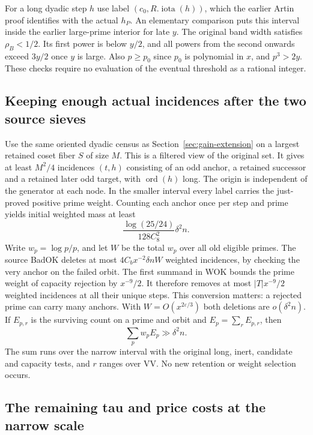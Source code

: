 \documentclass[12pt,letterpaper]{article}
\DeclareRobustCommand{\id}[1]{\mbox{\small\ttfamily #1}}
\begin{document}
For a long dyadic step \(h\) use label \((c_0,R.\operatorname{iota}(h))\), which the earlier Artin proof identifies with the actual \(h_P\). An elementary comparison puts this interval inside the earlier large-prime interior for late \(y\). The original band width satisfies \(\rho_B<1/2\). Its first power is below \(y/2\), and all powers from the second onwards exceed \(3y/2\) once \(y\) is large. Also \(p\ge p_0\) since \(p_0\) is polynomial in \(x\), and \(p^3>2y\). These checks require no evaluation of the eventual threshold as a rational integer.

\subsection{Keeping enough actual incidences after the two source sieves}

Use the same oriented dyadic census as Section~\ref{sec:gain-extension} on a largest retained coset fiber \(S\) of size \(M\). This is a filtered view of the original set. It gives at least \(M^2/4\) incidences \((t,h)\) consisting of an odd anchor, a retained successor and a retained later odd target, with \(\operatorname{ord}(h)\) long. The origin is independent of the generator at each node. In the smaller interval every label carries the just-proved positive prime weight. Counting each anchor once per step and prime yields initial weighted mass at least
\[
                  \frac{\log(25/24)}{128 C_8^2}\delta^2 n .
\]
Write \(w_p=\log p/p\), and let \(W\) be the total \(w_p\) over all old eligible primes. The source \id{BadOK} deletes at most \(4C_b x^{-2}\delta n W\) weighted incidences, by checking the very anchor on the failed orbit. The first summand in \id{WOK} bounds the prime weight of capacity rejection by \(x^{-9}/2\). It therefore removes at most \(|T|x^{-9}/2\) weighted incidences at all their unique steps. This conversion matters: a rejected prime can carry many anchors. With \(W=O(x^{2\varepsilon/3})\) both deletions are \(o(\delta^2 n)\). If \(E_{p,r}\) is the surviving count on a prime and orbit and \(E_p=\sum_r E_{p,r}\), then
\begin{equation}
                   \sum_p w_p E_p\gg\delta^2 n.
                   \label{eq:window-inc-mass}
\end{equation}
The sum runs over the narrow interval with the original long, inert, candidate and capacity tests, and \(r\) ranges over \id{VV}. No new retention or weight selection occurs.

\subsection{The remaining tau and price costs at the narrow scale}
\end{document}
